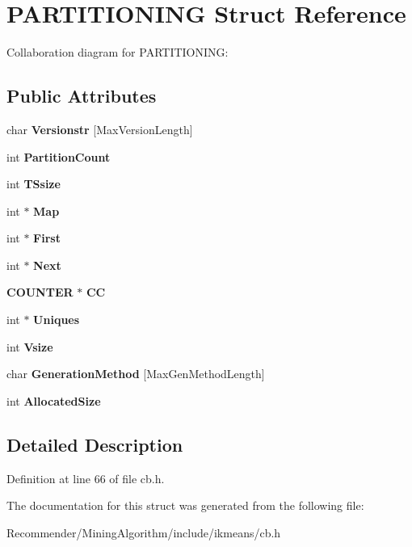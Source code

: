\section{PARTITIONING Struct Reference}
\label{structPARTITIONING}
Collaboration diagram for PARTITIONING:\subsection*{Public Attributes}
\begin{CompactItemize}
\item 
char {\bf Versionstr} [MaxVersionLength]\label{structPARTITIONING_86c4001739f6d6d9f36ca38cd5a8ab51}

\item 
int {\bf PartitionCount}\label{structPARTITIONING_760f361a238d9950485afb307ec1c183}

\item 
int {\bf TSsize}\label{structPARTITIONING_2f5fe14c1e84168eb0d1b8952f89e0f7}

\item 
int $\ast$ {\bf Map}\label{structPARTITIONING_8671aa051d7104a04971f630d938ae67}

\item 
int $\ast$ {\bf First}\label{structPARTITIONING_b23bbe47fe39b165c3e1f91087803164}

\item 
int $\ast$ {\bf Next}\label{structPARTITIONING_52c76e5b27901988fb4f41593ee7b86d}

\item 
{\bf COUNTER} $\ast$ {\bf CC}\label{structPARTITIONING_7e9162c6abb214e39490d3cf3163186e}

\item 
int $\ast$ {\bf Uniques}\label{structPARTITIONING_6b1573c5cb90dbec547142c92baac169}

\item 
int {\bf Vsize}\label{structPARTITIONING_0571b06462762818c906712e00b78df7}

\item 
char {\bf GenerationMethod} [MaxGenMethodLength]\label{structPARTITIONING_3f79ee5b9ffb5b8b13c708e811340921}

\item 
int {\bf AllocatedSize}\label{structPARTITIONING_6e0ac07069736ac21d14cd1520756990}

\end{CompactItemize}


\subsection{Detailed Description}




Definition at line 66 of file cb.h.

The documentation for this struct was generated from the following file:\begin{CompactItemize}
\item 
Recommender/MiningAlgorithm/include/ikmeans/cb.h\end{CompactItemize}
